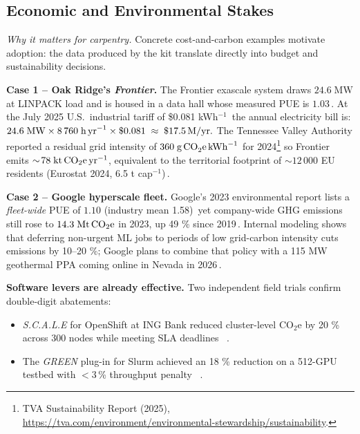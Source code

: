 \subsection{Economic and Environmental Stakes}
\label{sec:energy:econenv}

\textit{Why it matters for carpentry.}  
Concrete cost-and-carbon examples motivate adoption: the data produced by the kit translate directly into budget and sustainability decisions.

\noindent
\textbf{Case 1 – Oak Ridge’s \emph{Frontier}.} %
The Frontier exascale system draws
\(24.6\;\text{MW}\) at LINPACK load and is housed in a data hall whose measured PUE is \(1.03\)\,\cite{DOE_Frontier_Power2023}. At the July 2025 U.S.\ industrial tariff of
\$0.081 kWh\(^{-1}\)\,\cite{EIA_Electricity_Price_2025} the annual electricity bill is: $24.6\;\text{MW}\times 8\,760\;\text{h\,yr}^{-1}\times\$0.081
  \;\approx\;\$17.5\,\text{M}/\text{yr}.$  The Tennessee Valley Authority reported a residual grid intensity of
\(360\;\text{g\,CO}_{2}\text{e\,kWh}^{-1}\) for 2024\footnote{TVA
Sustainability Report (2025), \url{https://tva.com/environment/environmental-stewardship/sustainability}.} so Frontier emits
\(\sim\!78\;\text{kt\,CO}_{2}\text{e\,yr}^{-1}\), equivalent to the
territorial footprint of \(\sim\!12\,000\) EU residents
(Eurostat 2024, 6.5 t cap\(^{-1}\))\,\cite{Eurostat_GHG_2024}.

\noindent
\textbf{Case 2 – Google hyperscale fleet.} %
Google’s 2023 environmental report lists a \emph{fleet-wide} PUE of
\(\mathbf{1.10}\) (industry mean 1.58)\,\cite{Google_PUE_2023} yet company-wide GHG emissions still rose to
\(14.3\;\text{Mt\,CO}_{2}\text{e}\) in 2023, up 49 \% since
2019\,\cite{Google_Sustainability_2024}.   %
Internal modeling shows that deferring non-urgent ML jobs to periods of
low grid-carbon intensity cuts emissions by 10–20 \%; Google plans to
combine that policy with a 115 MW geothermal PPA coming online in Nevada
in 2026\,\cite{Google_Geothermal_2023}.   %

\noindent
\textbf{Software levers are already effective.}
Two independent field trials confirm double-digit abatements:

\begin{itemize}
  \item \emph{S.C.A.L.E} for OpenShift at ING Bank reduced cluster-level CO\(_2\)e by 20 \% across 300 nodes while meeting SLA deadlines
       ~\cite{ING_SCALE_2024}.   %
  \item The \emph{GREEN} plug-in for Slurm achieved an 18 \% reduction on a 512-GPU testbed with \(<\!3\)\,\% throughput penalty
       ~\cite{GREEN_Slurm_2025}.   %
\end{itemize}

